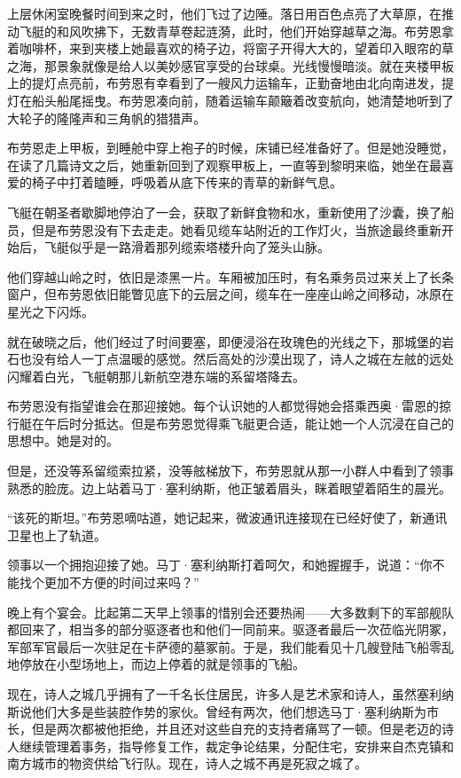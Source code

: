 \documentclass[AutoFakeBold=true]{book}
\begin{document}
上层休闲室晚餐时间到来之时，他们飞过了边陲。落日用百色点亮了大草原，在推动飞艇的和风吹拂下，无数青草卷起涟漪，此时，他们开始穿越草之海。布劳恩拿着咖啡杯，来到夹楼上她最喜欢的椅子边，将窗子开得大大的，望着印入眼帘的草之海，那景象就像是给人以美妙感官享受的台球桌。光线慢慢暗淡。就在夹楼甲板上的提灯点亮前，布劳恩有幸看到了一艘风力运输车，正勤奋地由北向南进发，提灯在船头船尾摇曳。布劳恩凑向前，随着运输车颠簸着改变航向，她清楚地听到了大轮子的隆隆声和三角帆的猎猎声。

布劳恩走上甲板，到睡舱中穿上袍子的时候，床铺已经准备好了。但是她没睡觉，在读了几篇诗文之后，她重新回到了观察甲板上，一直等到黎明来临，她坐在最喜爱的椅子中打着瞌睡，呼吸着从底下传来的青草的新鲜气息。

飞艇在朝圣者歇脚地停泊了一会，获取了新鲜食物和水，重新使用了沙囊，换了船员，但是布劳恩没有下去走走。她看见缆车站附近的工作灯火，当旅途最终重新开始后，飞艇似乎是一路滑着那列缆索塔楼升向了笼头山脉。

他们穿越山岭之时，依旧是漆黑一片。车厢被加压时，有名乘务员过来关上了长条窗户，但布劳恩依旧能瞥见底下的云层之间，缆车在一座座山岭之间移动，冰原在星光之下闪烁。

就在破晓之后，他们经过了时间要塞，即便浸浴在玫瑰色的光线之下，那城堡的岩石也没有给人一丁点温暖的感觉。然后高处的沙漠出现了，诗人之城在左舷的远处闪耀着白光，飞艇朝那儿新航空港东端的系留塔降去。

布劳恩没有指望谁会在那迎接她。每个认识她的人都觉得她会搭乘西奥·雷恩的掠行艇在午后时分抵达。但是布劳恩觉得乘飞艇更合适，能让她一个人沉浸在自己的思想中。她是对的。

但是，还没等系留缆索拉紧，没等舷梯放下，布劳恩就从那一小群人中看到了领事熟悉的脸庞。边上站着马丁·塞利纳斯，他正皱着眉头，眯着眼望着陌生的晨光。

``该死的斯坦。''布劳恩嘀咕道，她记起来，微波通讯连接现在已经好使了，新通讯卫星也上了轨道。

领事以一个拥抱迎接了她。马丁·塞利纳斯打着呵欠，和她握握手，说道：``你不能找个更加不方便的时间过来吗？''

\vspace*{1em}

晚上有个宴会。比起第二天早上领事的惜别会还要热闹——大多数剩下的军部舰队都回来了，相当多的部分驱逐者也和他们一同前来。驱逐者最后一次莅临光阴冢，军部军官最后一次驻足在卡萨德的墓冢前。于是，我们能看见十几艘登陆飞船零乱地停放在小型场地上，而边上停着的就是领事的飞船。

现在，诗人之城几乎拥有了一千名长住居民，许多人是艺术家和诗人，虽然塞利纳斯说他们大多是些装腔作势的家伙。曾经有两次，他们想选马丁·塞利纳斯为市长，但是两次都被他拒绝，并且还对这些自充的支持者痛骂了一顿。但是老迈的诗人继续管理着事务，指导修复工作，裁定争论结果，分配住宅，安排来自杰克镇和南方城市的物资供给飞行队。现在，诗人之城不再是死寂之城了。
\end{document}

